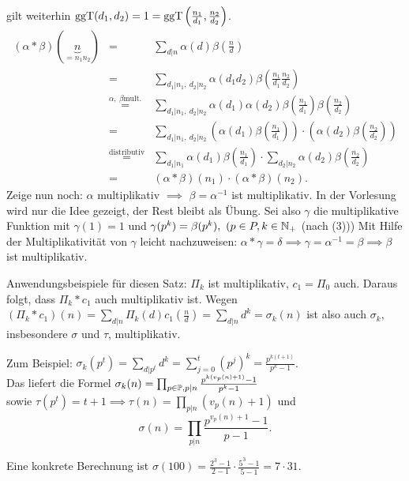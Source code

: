 \documentclass[a4paper,twoside,DIV15,BCOR12mm]{scrbook}
\begin{document}
\begin{beweis}
\begin{enumerate}
        gilt weiterhin $\mathop{\rm ggT}\nolimits(d_1,d_2)=1=\mathop{\rm ggT}\nolimits\left(\frac {n_1}{d_1},\frac{n_2}{d_2}
        \right)$.
        \begin{eqnarray*}
            (\alpha * \beta)(\underbrace{n}_{=n_1 n_2}) &=&
            \sum_{d|n} \alpha(d) \beta(\frac n d)\\
            &=&\sum_{d_1|n_1,\ d_2|n_2} \alpha(d_1 d_2) \beta\left(\frac
            {n_1}{d_1} \frac{n_2}{d_2}\right)\\
            &\stackrel{\alpha,\ \beta \text{
            mult.}}{=}&\sum_{d_1|n_1,\ d_2|n_2} \alpha(d_1) \alpha(d_2)
            \beta\left(\frac{n_1}{d_1}\right)
            \beta\left(\frac{n_2}{d_2}\right)\\
            &=&\sum_{d_1|n_1,\ d_2|n_2} \left(\alpha(d_1)
            \beta\left(\frac{n_1}{d_1}\right)\right) \cdot
            \left(\alpha(d_2)\beta\left(\frac{n_2}{d_2}\right)\right)\\
            &\stackrel{\text{distributiv}}{=}&\sum_{d_1|n_1} \alpha(d_1)
            \beta\left(\frac{n_1}{d_1}\right) \cdot \sum_{d_2|n_2}
            \alpha(d_2)\beta\left(\frac{n_2}{d_2}\right)\\
            &=& (\alpha * \beta)(n_1) \cdot (\alpha * \beta)(n_2).
        \end{eqnarray*}
        Zeige nun noch: $\alpha$ multiplikativ $\implies$
        $\beta=\alpha^{-1}$ ist multiplikativ. In der Vorlesung wird
        nur die Idee gezeigt, der Rest bleibt als Übung. Sei also
        $\gamma$ die multiplikative Funktion mit $\gamma(1)=1$ und
        $\gamma(p^k)=\beta(p^k),\ (p\in P, k \in \mathbb{N}_+$ (nach (3)))
        Mit Hilfe der Multiplikativität von $\gamma$ leicht
        nachzuweisen: $\alpha * \gamma = \delta \implies
        \gamma=\alpha^{-1}=\beta \implies \beta$ ist multiplikativ.
    \end{enumerate}
\end{beweis}

\begin{beispiel}
Anwendungsbeispiele für diesen Satz: $\Pi_k$ ist multiplikativ, $c_1
= \Pi_0$ auch. Daraus folgt, dass $\Pi_k * c_1$ auch multiplikativ
ist. Wegen $(\Pi_k * c_1)(n) = \sum_{d|n} \Pi_k(d) c_1(\frac n d) =
\sum_{d|n} d^k = \sigma_k(n)$ ist also auch $\sigma_k$, insbesondere
$\sigma$ und $\tau$, multiplikativ.

Zum Beispiel: $\sigma_k(p^t) = \sum_{d|p^t} d^k = \sum_{j=0}^t
(p^j)^k = \frac{p^{k(t+1)}}{p^k-1}$. \\
Das liefert die Formel
$\sigma_k(n) = \prod_{p\in\mathbb{P}, p|n} \frac{p^{k(v_p(n)+1)} - 1}{p^k-1}$ \\
sowie $\tau(p^t) = t+1 \implies \tau(n) = \prod_{p|n}(v_p(n) + 1)$ und
\begin{equation}\label{eq:Teilersumme}
    \sigma(n) = \prod_{p|n} \frac {p^{v_p(n) +1} -1 }{p-1}.
\end{equation}

Eine konkrete Berechnung ist $\sigma(100) = \frac{2^3 - 1}{2-1}
\cdot \frac{5^3 -1}{5-1} = 7\cdot 31$.
\end{beispiel}
\end{document}
